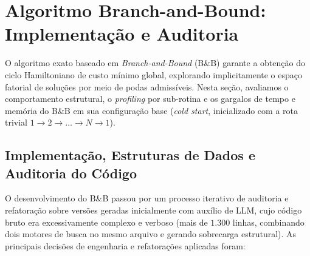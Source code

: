 \section{Algoritmo Branch-and-Bound: Implementação e Auditoria}
\label{sec:bnb}

O algoritmo exato baseado em \textit{Branch-and-Bound} (B\&B) garante a obtenção do ciclo Hamiltoniano de custo mínimo global, explorando implicitamente o espaço fatorial de soluções por meio de podas admissíveis. Nesta seção, avaliamos o comportamento estrutural, o \textit{profiling} por sub-rotina e os gargalos de tempo e memória do B\&B em sua configuração base (\textit{cold start}, inicializado com a rota trivial $1 \to 2 \to \dots \to N \to 1$).

\subsection{Implementação, Estruturas de Dados e Auditoria do Código}

O desenvolvimento do B\&B passou por um processo iterativo de auditoria e refatoração sobre versões geradas inicialmente com auxílio de LLM, cujo código bruto era excessivamente complexo e verboso (mais de $1.300$ linhas, combinando dois motores de busca no mesmo arquivo e gerando sobrecarga estrutural). As principais decisões de engenharia e refatorações aplicadas foram:

